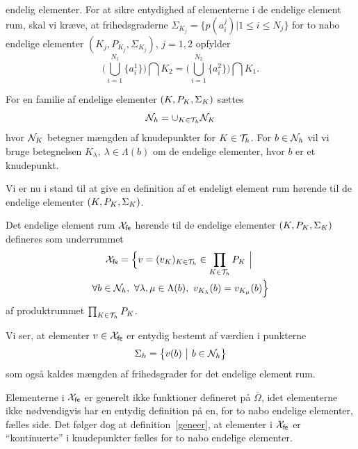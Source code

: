endelig elementer. For at sikre entydighed af elementerne i de
endelige element rum, skal vi kræve, at
frihedsgraderne $\Sigma_{K_j}=\{p(a_i^j) | 1 \leq i \leq N_j\}$ for to
nabo endelige elementer $(K_j,P_{K_j},\Sigma_{K_j})$, $j=1,2$ opfylder
\begin{equation}
  \big(\bigcup_{i=1}^{N_1} \{a_i^1\}\big) \bigcap K_2 =
  \big(\bigcup_{i=1}^{N_2} \{a_i^2\}\big) \bigcap K_1 .
\end{equation}
\begin{definition}
For en familie af endelige elementer $(K,P_K,\Sigma_K)$ sættes
\begin{equation}
  {\cal{N}}_h = \cup_{K \in {\cal{T}}_h} {\cal{N}}_K
\end{equation}
hvor ${\cal{N}}_K$ betegner mængden af knudepunkter for $K\in {\cal{T}}_h$. For 
$b\in {\cal{N}}_h$ vil vi bruge betegnelsen $K_{\lambda}, \ \lambda\in \Lambda(b)$
om de endelige elementer, hvor $b$ er et knudepunkt.
\end{definition}
Vi er nu i stand til at give en definition af et endeligt element rum 
hørende til de endelige elementer $(K,P_K,\Sigma_K)$.
\begin{definition} \label{geneer}
Det endelige element rum ${\mathcal{X}}_{\mathsf{fe}}$ hørende til de endelige elementer 
$(K,P_K,\Sigma_K)$ defineres som underrummet 
\begin{multline}
 {\mathcal{X}}_{\mathsf{fe}} = \Bigl\{ v=(v_K)_{K\in {\cal{T}}_h} \in \prod_{K\in {\cal{T}}_h} P_K \ \Big| \
       \\ \forall b\in {\cal{N}}_h, \ \forall \lambda,\mu \in \Lambda (b), \
       v_{K_{\lambda}}(b)=v_{K_{\mu}}(b) \Bigr\}
\end{multline}
af produktrummet $\prod_{K\in {\cal{T}}_h} P_K$.
\end{definition}
\begin{remark}
Vi ser, at elementer $v\in{\mathcal{X}}_{\mathsf{fe}}$ er entydig bestemt af værdien i punkterne
\begin{equation}
  \Sigma_h = \big\{ v(b)\ \big| \ b\in {\cal{N}}_h \big\}
\end{equation}
som også kaldes mængden af frihedsgrader for det endelige element rum.
\end{remark}
\begin{remark}
Elementerne i ${\mathcal{X}}_{\mathsf{fe}}$ er generelt ikke funktioner defineret på 
$\overline{\Omega}$, idet elementerne ikke nødvendigvis har en entydig 
definition på en, for to nabo endelige elementer, fælles side. Det 
følger dog at definition~\ref{geneer}, at elementer i ${\mathcal{X}}_{\mathsf{fe}}$ er ``kontinuerte'' i 
knudepunkter fælles for to nabo endelige elementer.
\end{remark}





